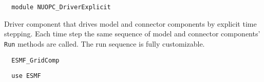  
\setlength{\parskip}{0pt}
\setlength{\parindent}{0pt}
\setlength{\baselineskip}{11pt}
 
\def\bv{\begin{verbatim}}
\def\ev{\end{verbatim}}
\def\be{\begin{equation}}
\def\ee{\end{equation}}
\def\bea{\begin{eqnarray}}
\def\eea{\end{eqnarray}}
\def\bi{\begin{itemize}}
\def\ei{\end{itemize}}
\def\bn{\begin{enumerate}}
\def\en{\end{enumerate}}
\def\bd{\begin{description}}
\def\ed{\end{description}}
\def\({\left (}
\def\){\right )}
\def\[{\left [}
\def\]{\right ]}
\def\<{\left  \langle}
\def\>{\right \rangle}
\def\cI{{\cal I}}
\def\diag{\mathop{\rm diag}}
\def\tr{\mathop{\rm tr}}


\begin{verbatim}  module NUOPC_DriverExplicit
\end{verbatim}

Driver component that drives model and connector components by explicit time stepping. Each time step the same sequence of model and connector components' {\tt Run} methods are called. The run sequence is fully customizable.

\begin{verbatim}  ESMF_GridComp
\end{verbatim}

\begin{verbatim}  use ESMF
\end{verbatim}

